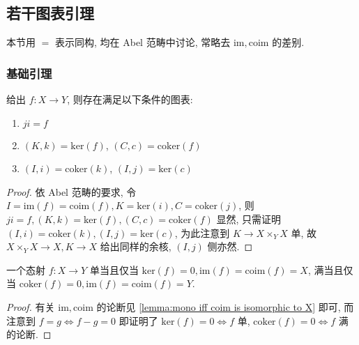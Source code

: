 \subsection{若干图表引理}

本节用 \(=\) 表示同构, 均在 Abel 范畴中讨论, 常略去 \(\mathrm{im},\mathrm{coim}\) 的差别.

\subsubsection{基础引理}

\begin{lemma}
    \label {lemma:composition of kernels,cokernels and images,coimages}
    给出 \(f : X \to Y\), 则存在满足以下条件的图表:

    \begin{center}
    \end{center}

    \begin{enumerate}
        \item \(j i = f\)
        \item \((K,k) = \mathrm{ker} (f)\), \((C,c) = \mathrm{coker} (f)\)
        \item \((I,i) = \mathrm{coker} (k)\), \((I,j) = \mathrm{ker} (c)\)
    \end{enumerate}

    \begin{proof}
        依 Abel 范畴的要求, 令 \(I = \mathrm{im} (f) = \mathrm{coim} (f), K = \mathrm{ker} (i),C = \mathrm{coker} (j)\),
        则 \(j i = f, (K,k) = \mathrm{ker} (f), (C,c) = \mathrm{coker} (f)\) 显然, 只需证明 \((I,i) = \mathrm{coker} (k), (I,j) = \mathrm{ker} (c)\),
        为此注意到 \(K \to X \times_Y X\) 单, 故 \(X \times_Y X \to X,K \to X\) 给出同样的余核, \((I,j)\) 侧亦然.
    \end{proof}
\end{lemma}

\begin{lemma}
    一个态射 \(f:X \to Y\) 单当且仅当 \(\mathrm{ker} (f) = 0,\mathrm{im} (f) = \mathrm{coim} (f) = X\), 满当且仅当 \(\mathrm{coker} (f) = 0,\mathrm{im} (f) = \mathrm{coim} (f) = Y\).

    \begin{proof}
        有关 \(\mathrm{im},\mathrm{coim}\) 的论断见 \ref{lemma:mono iff coim is isomorphic to X} 即可, 
        而注意到 \(f = g \iff f - g = 0\) 即证明了 \(\mathrm{ker} (f) = 0 \iff f\) 单, \(\mathrm{coker} (f) = 0 \iff f\) 满的论断.
    \end{proof}
\end{lemma}

